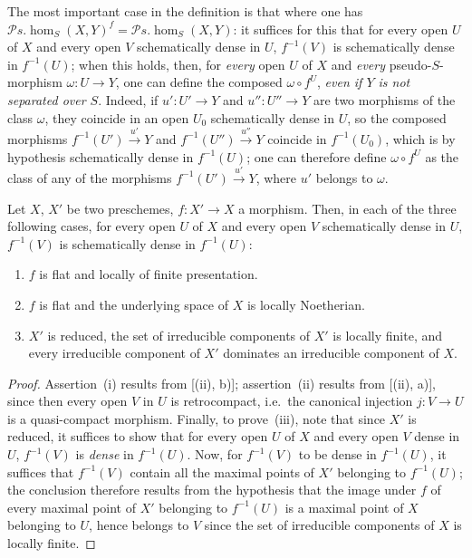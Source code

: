 \begin{env}[20.3.4]
\label{IV.20.3.4}
The most important case in the definition  is that where one has $\mathscr{P}\!s.\!\operatorname{hom}_S(X,Y)^f=\mathscr{P}\!s.\!\operatorname{hom}_S(X,Y)$:
it suffices for this that for every open $U$ of $X$ and every open $V$ schematically dense in $U$, $f^{-1}(V)$ is schematically dense in $f^{-1}(U)$;
when this holds, then, for \emph{every} open $U$ of $X$ and \emph{every} pseudo-$S$-morphism $\omega:U\to Y$, one can define the composed $\omega\circ f^U$, \emph{even if $Y$ is not separated over $S$}.
Indeed, if $u':U'\to Y$ and $u'':U''\to Y$ are two morphisms of the class $\omega$, they coincide in an open $U_0$ schematically dense in $U$, so the composed morphisms $f^{-1}(U')\xrightarrow{u'}Y$ and $f^{-1}(U'')\xrightarrow{u''}Y$ coincide in $f^{-1}(U_0)$, which is by hypothesis schematically dense in $f^{-1}(U)$;
one can therefore define $\omega\circ f^U$ as the class of any of the morphisms $f^{-1}(U')\xrightarrow{u'}Y$, where $u'$ belongs to $\omega$.
\end{env}

\begin{proposition}[20.3.5]
\label{IV.20.3.5}
Let $X$, $X'$ be two preschemes, $f:X'\to X$ a morphism.
Then, in each of the three following cases, for every open $U$ of $X$ and every open $V$ schematically dense in $U$, $f^{-1}(V)$ is schematically dense in $f^{-1}(U)$:
\begin{enumerate}[label=\emph{(\roman*)}]
  \item $f$ is flat and locally of finite presentation.
  \item $f$ is flat and the underlying space of $X$ is locally Noetherian.
  \item $X'$ is reduced, the set of irreducible components of $X'$ is locally finite, and every irreducible component of $X'$ dominates an irreducible component of $X$.
\end{enumerate}
\end{proposition}

\begin{proof}
Assertion~(i) results from [(ii), b)];
assertion~(ii) results from [(ii), a)], since then every open $V$ in $U$ is retrocompact, i.e.\ the canonical injection $j:V\to U$ is a quasi-compact morphism.
Finally, to prove~(iii), note that since $X'$ is reduced, it suffices to show that for every open $U$ of $X$ and every open $V$ dense in $U$, $f^{-1}(V)$ is \emph{dense} in $f^{-1}(U)$.
Now, for $f^{-1}(V)$ to be dense in $f^{-1}(U)$, it suffices that $f^{-1}(V)$ contain all the maximal points of $X'$ belonging to $f^{-1}(U)$;
  the conclusion therefore results from the hypothesis that the image under $f$ of every
maximal point of $X'$ belonging to $f^{-1}(U)$ is a maximal point of $X$ belonging to $U$, hence belongs to $V$ since the set of irreducible components of $X$ is locally finite.
\end{proof}

